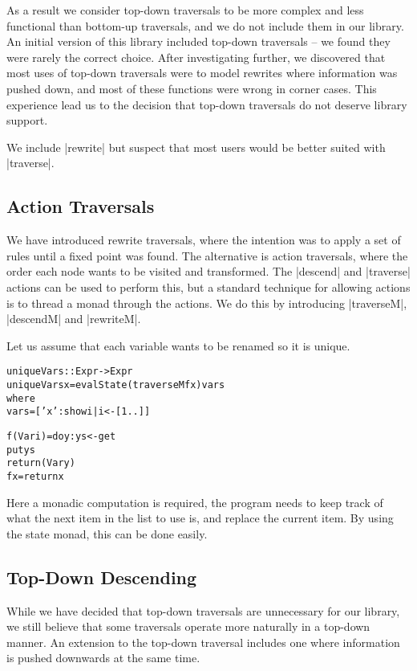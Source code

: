 \documentclass[preprint]{sigplanconf}
\newenvironment{code}{\begin{alltt}\small}{\end{alltt}}
\begin{document}
As a result we consider top-down traversals to be more complex and less functional than bottom-up traversals, and we do not include them in our library. An initial version of this library included top-down traversals -- we found they were rarely the correct choice. After investigating further, we discovered that most uses of top-down traversals were to model rewrites where information was pushed down, and most of these functions were wrong in corner cases. This experience lead us to the decision that top-down traversals do not deserve library support.

We include |rewrite| but suspect that most users would be better suited with |traverse|.


\subsection{Action Traversals}

We have introduced rewrite traversals, where the intention was to apply a set of rules until a fixed point was found. The alternative is action traversals, where the order each node wants to be visited and transformed. The |descend| and |traverse| actions can be used to perform this, but a standard technique for allowing actions is to thread a monad through the actions. We do this by introducing |traverseM|, |descendM| and |rewriteM|.

Let us assume that each variable wants to be renamed so it is unique.

\begin{code}
uniqueVars :: Expr -> Expr
uniqueVars x = evalState (traverseM f x) vars
    where
        vars = ['x':show i | i <- [1..]]

        f (Var i)  = do  y:ys <- get
                         put ys
                         return (Var y)
        f x        = return x
\end{code}

Here a monadic computation is required, the program needs to keep track of what the next item in the list to use is, and replace the current item. By using the state monad, this can be done easily.


\subsection{Top-Down Descending}

While we have decided that top-down traversals are unnecessary for our library, we still believe that some traversals operate more naturally in a top-down manner. An extension to the top-down traversal includes one where information is pushed downwards at the same time.
\end{document}
